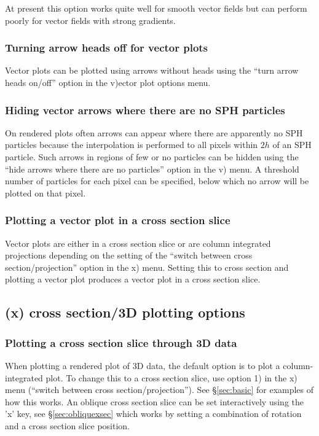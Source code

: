 \documentclass[a4paper,11pt]{article}
\begin{document}
  At present this option works quite well for smooth vector fields but can perform poorly for vector fields with strong gradients.

\subsubsection{ Turning arrow heads off for vector plots}
 Vector plots can be plotted using arrows without heads using the ``turn arrow heads on/off'' option in the v)ector plot options menu.

\subsubsection{ Hiding vector arrows where there are no SPH particles}
 On rendered plots often arrows can appear where there are apparently no SPH particles because the interpolation is performed to all pixels within $2h$ of an SPH particle. Such arrows in regions of few or no particles can be hidden using the ``hide arrows where there are no particles'' option in the v) menu. A threshold number of particles for each pixel can be specified, below which no arrow will be plotted on that pixel.

\subsubsection{ Plotting a vector plot in a cross section slice}
 Vector plots are either in a cross section slice or are column integrated projections depending on the setting of the ``switch between cross section/projection'' option in the x) menu. Setting this to cross section and plotting a vector plot produces a vector plot in a cross section slice.

\subsection{(x) cross section/3D plotting options}

\subsubsection{ Plotting a cross section slice through 3D data}
 When plotting a rendered plot of 3D data, the default option is to plot a column-integrated plot. To change this to a cross section slice, use option 1) in the x) menu (``switch between cross section/projection''). See \S\ref{sec:basic} for examples of how this works. An oblique cross section slice can be set interactively using the 'x' key, see \S\ref{sec:obliquexsec} which works by setting a combination of rotation and a cross section slice position. 
\end{document}
